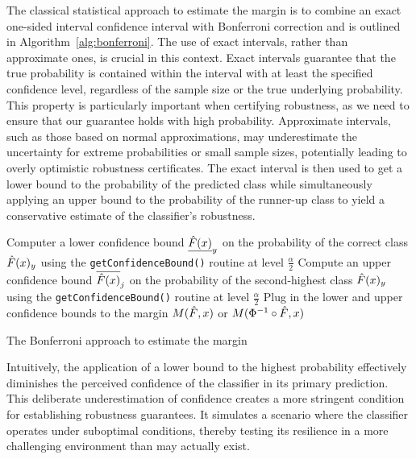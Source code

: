 The classical statistical approach to estimate the margin is to combine an exact one-sided interval confidence interval with Bonferroni correction and is outlined in Algorithm~\ref{alg:bonferroni}.
The use of exact intervals, rather than approximate ones, is crucial in this context.
Exact intervals guarantee that the true probability is contained within the interval with at least the specified confidence level, regardless of the sample size or the true underlying probability.
This property is particularly important when certifying robustness, as we need to ensure that our guarantee holds with high probability.
Approximate intervals, such as those based on normal approximations, may underestimate the uncertainty for extreme probabilities or small sample sizes, potentially leading to overly optimistic robustness certificates.
The exact interval is then used to get a lower bound to the probability of the predicted class while simultaneously applying an upper bound to the probability of the runner-up class to yield a conservative estimate of the classifier's robustness.

\begin{algorithm}[H]
    \DontPrintSemicolon %

    Computer a lower confidence bound $\underline{\Hat{F}(x)}_{y}$ on the probability of the correct class $\Hat{F}(x)_{y}$ using the \texttt{getConfidenceBound()} routine at level $\frac{\alpha}{2}$\;
    Compute an upper confidence bound $\overline{\Hat{F}(x)}_{j}$ on the probability of the second-highest class $\Hat{F}(x)_{y}$ using the \texttt{getConfidenceBound()} routine at level $\frac{\alpha}{2}$\;
    Plug in the lower and upper confidence bounds to the margin $M(\Hat{F},x)$ or $M(\Phi^{-1}\circ\Hat{F},x)$\;
    \caption{The Bonferroni approach to estimate the margin}\label{alg:bonferroni}
\end{algorithm}

Intuitively, the application of a lower bound to the highest probability effectively diminishes the perceived confidence of the classifier in its primary prediction.
This deliberate underestimation of confidence creates a more stringent condition for establishing robustness guarantees.
It simulates a scenario where the classifier operates under suboptimal conditions, thereby testing its resilience in a more challenging environment than may actually exist.

